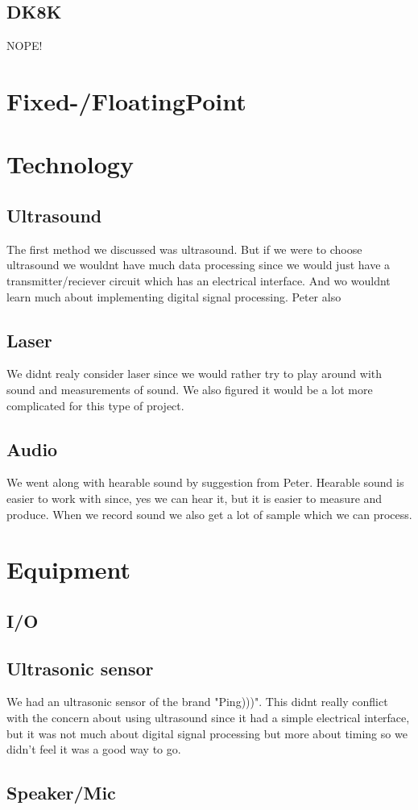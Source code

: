 \subsection{DK8K}
NOPE!\\
\section{Fixed-/FloatingPoint}
\section{Technology}
\subsection{Ultrasound}
The first method we discussed was ultrasound. But if we were to choose ultrasound we wouldnt have much data processing since we would just have a transmitter/reciever circuit which has an electrical interface. And wo wouldnt learn much about implementing digital signal processing. Peter also 

\subsection{Laser}
We didnt realy consider laser since we would rather try to play around with sound and measurements of sound. We also figured it would be a lot more complicated for this type of project.

\subsection{Audio}
We went along with hearable sound by suggestion from Peter. Hearable sound is easier to work with since, yes we can hear it, but it is easier to measure and produce. When we record sound we also get a lot of sample which we can process.

\section{Equipment}
\subsection{I/O}

\subsection{Ultrasonic sensor}
We had an ultrasonic sensor of the brand "Ping)))". This didnt really conflict with the concern about using ultrasound since it had a simple electrical interface, but it was not much about digital signal processing but more about timing so we didn't feel it was a good way to go.
\subsection{Speaker/Mic}